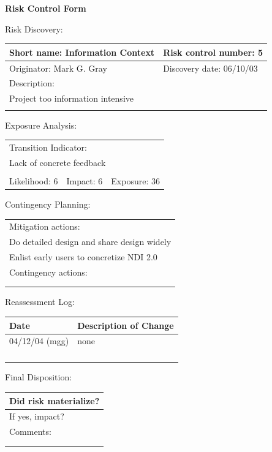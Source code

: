 \documentclass{article}
\begin{document}
\begin{center}\Large\bf
Risk Control Form
\end{center}
\vspace{24pt}

Risk Discovery:

\begin{tabular}{|p{211pt}|p{211pt}|} \hline
Short name: Information Context & Risk control number: 5\\ \hline
Originator: Mark G. Gray & Discovery date: 06/10/03\\ \hline
\multicolumn{2}{|l|}{Description:} \\
\multicolumn{2}{|l|}{Project too information intensive} \\
\multicolumn{2}{|l|}{\mbox{}} \\ \hline
\end{tabular}
\vspace{24pt}

Exposure Analysis:

\begin{tabular}{|p{138pt}|p{138pt}|p{138pt}|} \hline
\multicolumn{3}{|l|}{Transition Indicator:} \\
\multicolumn{3}{|l|}{Lack of concrete feedback} \\
\multicolumn{3}{|l|}{\mbox{}} \\ \hline
Likelihood: 6 & Impact: 6 & Exposure: 36\\ \hline
\end{tabular}
\vspace{24pt}

Contingency Planning:

\begin{tabular}{|p{433pt}|} \hline
Mitigation actions: \\
Do detailed design and share design widely \\
Enlist early users to concretize NDI 2.0 \\ \hline
Contingency actions: \\
\mbox{} \\
\mbox{} \\ \hline
\end{tabular}
\vspace{24pt}

Reassessment Log:

\begin{tabular}{|p{72pt}|p{351pt}|} \hline
Date & Description of Change \\ \hline
04/12/04 (mgg) & none \\ \hline
\mbox{} & \mbox{} \\ \hline
\mbox{} & \mbox{} \\ \hline
\mbox{} & \mbox{} \\ \hline
\mbox{} & \mbox{} \\ \hline
\end{tabular}
\vspace{24pt}

Final Disposition:

\begin{tabular}{|p{433pt}|} \hline
Did risk materialize? \\ \hline
If yes, impact? \\ \hline
Comments: \\
\mbox{} \\
\mbox{} \\ \hline
\end{tabular}
\end{document}
